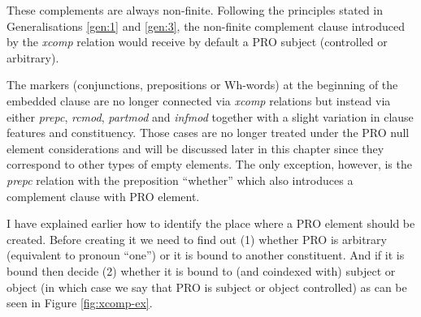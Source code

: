     These complements are always non-finite. Following the principles stated in Generalisations \ref{gen:1} and \ref{gen:3}, the non-finite complement clause introduced by the \textit{xcomp} relation would receive by default a PRO subject (controlled or arbitrary).

    The markers (conjunctions, prepositions or Wh-words) at the beginning of the embedded clause are no longer connected via \textit{xcomp} relations but instead via either \textit{prepc}, \textit{rcmod}, \textit{partmod} and \textit{infmod} together with a slight variation in clause features and constituency. Those cases are no longer treated under the PRO null element considerations and will be discussed later in this chapter since they correspond to other types of empty elements. The only exception, however, is the \textit{prepc} relation with the preposition ``whether'' which also introduces a complement clause with PRO element.


    I have explained earlier how to identify the place where a PRO element should be created. Before creating it we need to find out (1) whether PRO is arbitrary (equivalent to pronoun ``one'') or it is bound to another constituent. And if it is bound then decide (2) whether it is bound to (and coindexed with) subject or object (in which case we say that PRO is subject or object controlled) as can be seen in Figure \ref{fig:xcomp-ex}.


